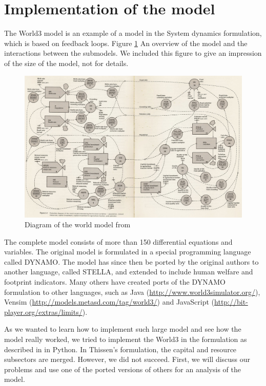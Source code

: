 \documentclass[10pt,a4paper]{scrartcl}
\begin{document}
\section*{Implementation of the model}

The World3 model is an example of a model in the System dynamics formulation, which is based on feedback loops. Figure \ref{world3} An overview of the model and the interactions between the submodels. We included this figure to give an impression of the size of the model, not for details.

\begin{figure}
\centering
\includegraphics[width=\textwidth]{./plaatjes/model.jpg}
\caption{Diagram of the world model from \cite{forresterworld}}
\label{world3}
\end{figure}

The complete model consists of more than 150 differential equations and variables. The original model is formulated in a special programming language called DYNAMO. The model has since then be ported by the original authors to another language, called STELLA, and extended to include human welfare and footprint indicators. Many others have created ports of the DYNAMO formulation to other languages, such as Java (\url{http://www.world3simulator.org/}), Vensim (\url{http://models.metasd.com/tag/world3/}) and JavaScript (\url{http://bit-player.org/extras/limits/}).

As we wanted to learn how to implement such large model and see how the model really worked, we tried to implement the World3 in the formulation as described in \cite{thissen1978investigations} in Python. In Thissen's formulation, the capital and resource subsectors are merged. However, we did not succeed. First, we will discuss our problems and use one of the ported versions of others for an analysis of the model.
\end{document}
